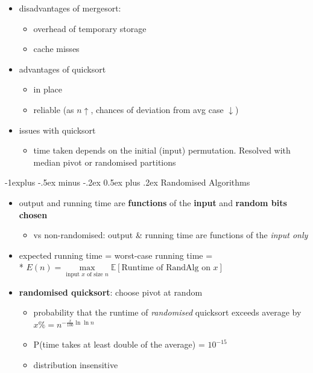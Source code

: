 \documentclass[10pt, landscape]{article}
\makeatletter
\renewcommand{\subsection}{\@startsection{subsection}{2}{0mm}%
  {-1explus -.5ex minus -.2ex}%
  {0.5ex plus .2ex}%
{\normalfont\normalsize\bfseries}}
\makeatother
\begin{document}
\begin{multicols*}{4}
  \begin{itemize}
    \item disadvantages of mergesort:
      \begin{itemize}
        \item overhead of temporary storage
        \item cache misses
      \end{itemize}
    \item advantages of quicksort
      \begin{itemize}
        \item in place
        \item reliable (as $n \uparrow$, chances of deviation from avg case $\downarrow$)
      \end{itemize}
    \item issues with quicksort
      \begin{itemize}
        \item {} time taken depends on the initial (input) permutation. Resolved with median pivot or randomised partitions
      \end{itemize}
  \end{itemize}

  \subsection{Randomised Algorithms}

  \begin{itemize}
    \item {} output and running time are \textbf{functions} of the \textbf{input} and \textbf{random bits chosen}
      \begin{itemize}
        \item vs non-randomised: output \& running time are functions of the \textit{input only}
      \end{itemize}
    \item expected running time = worst-case running time = 
      \\* $E(n) = \max\limits_{ \text{input $x$ of size $n$} } \mathbb{E} [ \text{Runtime of RandAlg on }x ] $
    \item \textbf{randomised quicksort}: choose pivot at random 
      \begin{itemize}
        \item probability that the runtime of \textit{randomised} quicksort exceeds average by $x\% = n^{-\frac{x}{100}\ln\ln n}$ 
        \item P(time takes at least double of the average) = $10^{-15}$
        \item distribution insensitive
      \end{itemize}
  \end{itemize}


\end{multicols*}
\end{document}
